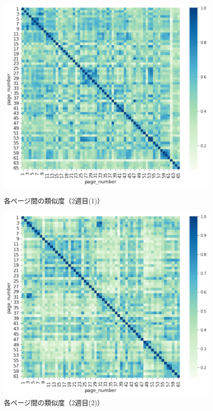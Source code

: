 \documentclass[a4paper,12pt]{ltjsreport}
\begin{document}
\begin{figure}[tbp]
  \begin{minipage}[b]{0.5\linewidth}
    \centering
    \includegraphics[scale=0.35]{2_1cos.pdf}
    \caption{各ページ間の類似度（2週目(1)）}
    \label{fig:2-1cos}
  \end{minipage}
  \begin{minipage}[b]{0.5\linewidth}
    \centering
    \includegraphics[scale=0.35]{2_2cos.pdf}
    \caption{各ページ間の類似度（2週目(2)）}
    \label{fig:2-2cos}
  \end{minipage}
\end{figure}
\end{document}
